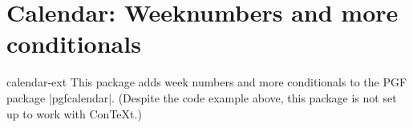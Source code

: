 %
%
%

\section{Calendar: Weeknumbers and more conditionals}
\begin{package}{calendar-ext}
  This package adds week numbers and more conditionals to the PGF package |pgfcalendar|.
  (Despite the code example above, this package is not set up to work with Con\TeX t.)
\end{package}


